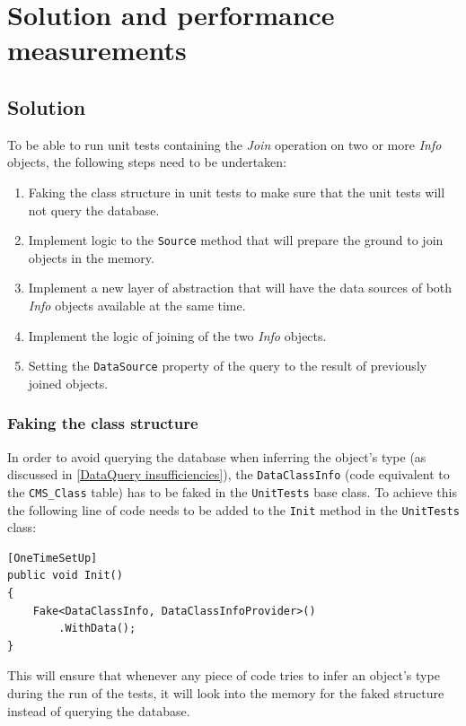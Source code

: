 \documentclass[
  print,
  table,
  nolof,
  nolot,
  nocover,
  oneside
]{fithesis3}
\begin{document}
\chapter{Solution and performance measurements}
\label{solution and performance measurements}


\section{Solution}
\label{solution}

To be able to run unit tests containing the \textit{Join} operation on two or more \textit{Info} objects, the following steps need to be undertaken:

\begin{enumerate}
    \item Faking the class structure in unit tests to make sure that the unit tests will not query the database.
    \item Implement logic to the \texttt{Source} method that will prepare the ground to join objects in the memory.
    \item Implement a new layer of abstraction that will have the data sources of both \textit{Info} objects available at the same time.
    \item Implement the logic of joining of the two \textit{Info} objects.
    \item Setting the \texttt{DataSource} property of the query to the result of previously joined objects.
\end{enumerate}

\subsection{Faking the class structure}
\label{faking the class structure}

In order to avoid querying the database when inferring the object's type (as discussed in \autoref{DataQuery insufficiencies}), the \texttt{DataClassInfo} (code equivalent to the \texttt{CMS\_Class} table) has to be faked in the \texttt{UnitTests} base class. To achieve this the following line of code needs to be added to the \texttt{Init} method in the \texttt{UnitTests} class:
\begin{lstlisting}
[OneTimeSetUp]
public void Init()
{
    Fake<DataClassInfo, DataClassInfoProvider>()
        .WithData();
}
\end{lstlisting}
This will ensure that whenever any piece of code tries to infer an object's type during the run of the tests, it will look into the memory for the faked structure instead of querying the database.
\end{document}
